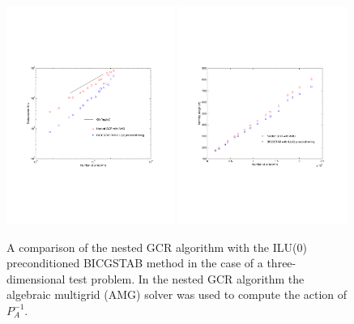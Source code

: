 \begin{figure}[h]
  \vspace{-3cm}
  \begin{center}
    \includegraphics[width=0.49\textwidth]{comptime.pdf}
    \includegraphics[width=0.49\textwidth]{memory.pdf}
   \end{center}
  \vspace{-3cm}
\caption{A comparison of the nested GCR algorithm with the ILU(0) preconditioned
BICGSTAB method in the case of a three-dimensional test problem. 
In the nested GCR algorithm the algebraic multigrid (AMG) solver was used to 
compute the action of $P_A^{-1}$.}
\end{figure}





